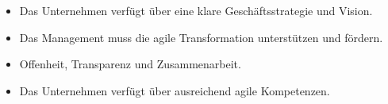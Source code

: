 \begin{itemize}
    \item Das Unternehmen verfügt über eine klare Geschäftsstrategie und Vision.
    \item Das Management muss die agile Transformation unterstützen und fördern.
    \item Offenheit, Transparenz und Zusammenarbeit.
    \item Das Unternehmen verfügt über ausreichend agile Kompetenzen.
\end{itemize}